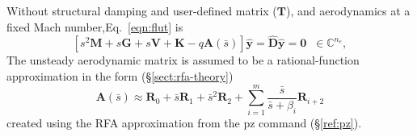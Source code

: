 \documentclass[11pt,openany,twoside]{book}
\numberwithin{equation}{section}		%
\newcommand{\Cmd}[1]{{\sf #1}}
\newcommand{\Matrix}[1]{\boldsymbol{#1}}
\newcommand{\Vector}[1]{\boldsymbol{#1}}
\newcommand{\Sectref}[1]{\S\ref{#1}}
\newcommand{\Eqn}[1]{Eq.\ \ref{#1}}  %
\begin{document}
Without structural damping and user-defined matrix ($\Matrix{T}$),
and aerodynamics at a fixed Mach number,\Eqn{eqn:flut} is
\begin{equation}
	\left[ s^2 \Matrix{M} + s \Matrix{G} + s \Matrix{V} +
		\Matrix{K} - q \Matrix{A} (\bar{s}) \right] \hat{\Vector{y}}
		= \hat{\Matrix{D}}\hat{\Vector{y}} = \Vector{0} \; \; \in \mathbb{C}^{n_e}, \nonumber
\end{equation}
The unsteady aerodynamic matrix is assumed to be a rational-function approximation
in the form (\Sectref{sect:rfa-theory})
\begin{equation}
\Matrix{A}(\bar{s}) \approx \Matrix{R}_0 + \bar{s}\Matrix{R}_1 + \bar{s}^2 \Matrix{R}_2 +  \sum_{i=1}^{m} \frac{\bar{s}}{\bar{s} + \beta_i} \Matrix{R}_{i+2}	\nonumber
\end{equation}
created using the RFA approximation from the \Cmd{pz} command (\Sectref{ref:pz}).
\end{document}
